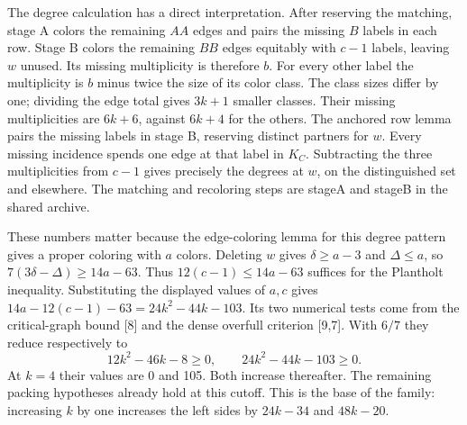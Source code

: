 \documentclass[english,11pt,a4paper]{article}
\begin{document}
The degree calculation has a direct interpretation. After reserving the matching, stage A colors the remaining \(AA\) edges and pairs the missing \(B\) labels in each row. Stage B colors the remaining \(BB\) edges equitably with \(c-1\) labels, leaving \(w\) unused. Its missing multiplicity is therefore \(b\). For every other label the multiplicity is \(b\) minus twice the size of its color class. The class sizes differ by one; dividing the edge total gives \(3k+1\) smaller classes. Their missing multiplicities are \(6k+6\), against \(6k+4\) for the others. The anchored row lemma pairs the missing labels in stage B, reserving distinct partners for \(w\). Every missing incidence spends one edge at that label in \(K_C\). Subtracting the three multiplicities from \(c-1\) gives precisely the degrees at \(w\), on the distinguished set and elsewhere. The matching and recoloring steps are stageA and stageB in the shared archive.

These numbers matter because the edge-coloring lemma for this degree pattern gives a proper coloring with \(a\) colors. Deleting \(w\) gives \(\delta\ge a-3\) and \(\Delta\le a\), so \(7(3\delta-\Delta)\ge14a-63\). Thus \(12(c-1)\le14a-63\) suffices for the Plantholt inequality. Substituting the displayed values of \(a,c\) gives \(14a-12(c-1)-63=24k^2-44k-103\). Its two numerical tests come from the critical-graph bound {[}8{]} and the dense overfull criterion {[}9,7{]}. With \(6/7\) they reduce respectively to \[12k^2-46k-8\ge0,\qquad 24k^2-44k-103\ge0.\] At \(k=4\) their values are 0 and 105. Both increase thereafter. The remaining packing hypotheses already hold at this cutoff. This is the base of the family: increasing \(k\) by one increases the left sides by \(24k-34\) and \(48k-20\).
\end{document}
